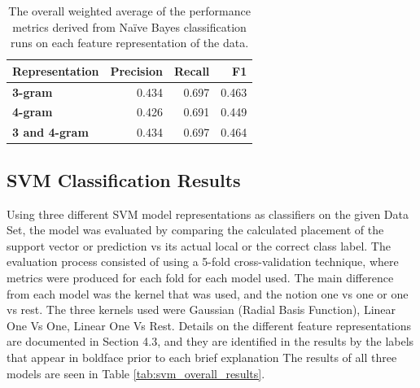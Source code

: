 \documentclass[conference]{sig-alternate-05-2015}
\begin{document}
\begin{table}[ht!]
  \centering
  \begin{tabular}{| l | r | r | r |}
    \hline
    \textbf{Representation} & \textbf{Precision} & \textbf{Recall} & \textbf{F1} \\
    \hline\hline
    \textbf{3-gram} & 0.434 & 0.697 & 0.463 \\
    \hline
    \textbf{4-gram} & 0.426 & 0.691 & 0.449 \\
    \hline
    \textbf{3 and 4-gram} & 0.434 & 0.697 & 0.464 \\
    \hline
  \end{tabular}
  \caption{The overall weighted average of the performance metrics derived from
  Na\"ive Bayes classification runs on each feature representation of the data.}
  \label{tab:bayes_overall_results}
\end{table}

\subsection{SVM Classification Results}\label{subsec:svm_results}

Using three different SVM model representations as classifiers on the given Data
Set, the model was evaluated by comparing the calculated placement of the
support vector or prediction vs its actual local or the correct class label. The
evaluation process consisted of using a 5-fold cross-validation technique, where
metrics were produced for each fold for each model used.  The main difference
from each model was the kernel that was used, and the notion one vs one or one
vs rest. The three kernels used were Gaussian (Radial Basis Function), Linear One
Vs One, Linear One Vs Rest. Details on the different feature representations are
documented in Section 4.3, and they are identified in the results by the labels
that appear in boldface prior to each  brief explanation The results of all
three models are seen in Table \ref{tab:svm_overall_results}.\par
\end{document}
